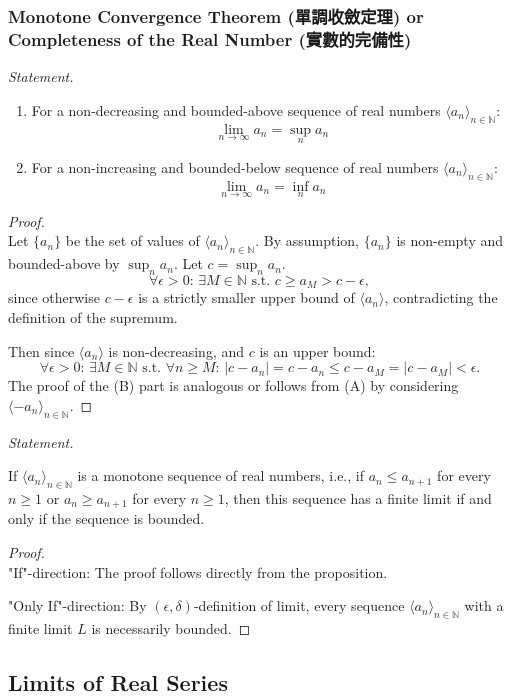 \documentclass[a4paper,12pt]{report}
\begin{document}
\subsubsection{Monotone Convergence Theorem (單調收斂定理) or Completeness of the Real Number (實數的完備性)}
\textit{Statement.}
\begin{enumerate}[label=(\Alph*)]
\item For a non-decreasing and bounded-above sequence of real numbers $\langle a_n\rangle_{n\in\mathbb {N}}$:
\[\lim_{n\to\infty}a_n=\sup_n a_n\]
\item For a non-increasing and bounded-below sequence of real numbers $\langle a_n\rangle_{n\in\mathbb {N}}$:
\[\lim_{n\to\infty}a_n=\inf_n a_n\]
\end{enumerate}
\begin{proof}\mbox{}\\
Let $\{a_{n}\}$ be the set of values of $\langle a_n\rangle_{n\in\mathbb {N}}$. By assumption, $\{a_n\}$ is non-empty and bounded-above by $\sup_n a_n$. Let $c=\sup_n a_n$.
\[\forall\epsilon>0:\,\exists M\in\mathbb {N}\text{\ s.t.\ }c\geq a_M>c-\epsilon,\]
since otherwise $c-\epsilon$ is a strictly smaller upper bound of $\langle a_n\rangle$, contradicting the definition of the supremum. 

Then since $\langle a_n\rangle$ is non-decreasing, and $c$ is an upper bound:
\[\forall\epsilon>0:\,\exists M\in\mathbb {N}\text{\ s.t.\ }\forall n\geq M:\,|c-a_n|=c-a_n\leq c-a_M=|c-a_M|<\epsilon.\]
The proof of the (B) part is analogous or follows from (A) by considering $\langle -a_{n}\rangle_{n\in \mathbb{N}}$.
\end{proof}
\textit{Statement.}

If $\langle a_n\rangle_{n\in\mathbb {N}}$ is a monotone sequence of real numbers, i.e., if 
$a_n\leq a_{n+1}$ for every $n\geq 1$ or $a_n\geq a_{n+1}$ for every $n\geq 1$, then this sequence has a finite limit if and only if the sequence is bounded.
\begin{proof}\mbox{}\\
"If"-direction: The proof follows directly from the proposition.

"Only If"-direction: By $(\epsilon,\delta)$-definition of limit, every sequence $\langle a_n\rangle_{n\in\mathbb {N}}$ with a finite limit $L$ is necessarily bounded.
\end{proof}
\subsection{Limits of Real Series}
\end{document}
